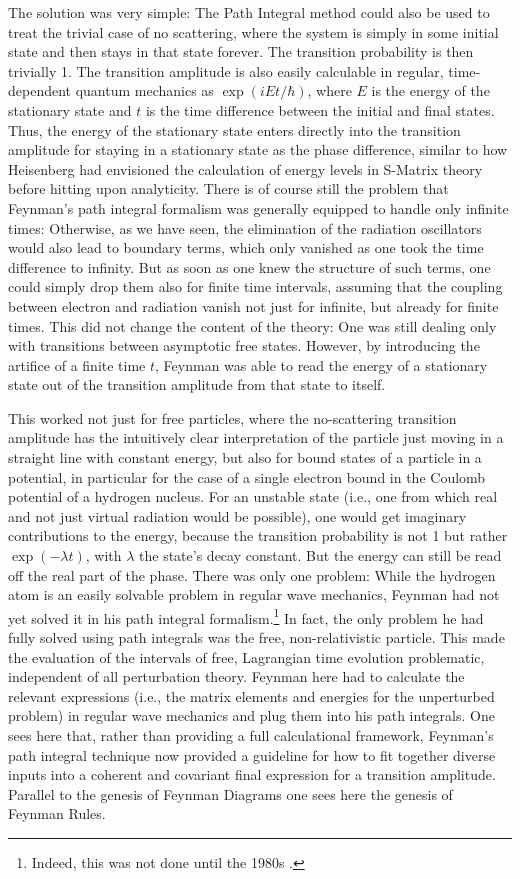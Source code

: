 \documentclass[12pt]{article}
\begin{document}
The solution was very simple: The Path Integral method could also be used to treat the trivial case of no scattering, where the system is simply in some initial state and then stays in that state forever. The transition probability is then trivially 1. The transition amplitude is also easily calculable in regular, time-dependent quantum mechanics as $\exp{(i E t/\hbar)}$, where $E$ is the energy of the stationary state and $t$ is the time difference between the initial and final states. Thus, the energy of the stationary state enters directly into the transition amplitude for staying in a stationary state as the phase difference, similar to how Heisenberg had envisioned the calculation of energy levels in S-Matrix theory before hitting upon analyticity. There is of course still the problem that Feynman's path integral formalism was generally equipped to handle only infinite times: Otherwise, as we have seen, the elimination of the radiation oscillators would also lead to boundary terms, which only vanished as one took the time difference to infinity. But as soon as one knew the structure of such terms, one could simply drop them also for finite time intervals, assuming that the coupling between electron and radiation vanish not just for infinite, but already for finite times. This did not change the content of the theory: One was still dealing only with transitions between asymptotic free states. However, by introducing the artifice of a finite time $t$, Feynman was able to read the energy of a stationary state out of the transition amplitude from that state to itself.

This worked not just for free particles, where the no-scattering transition amplitude has the intuitively clear interpretation of the particle just moving in a straight line with constant energy, but also for bound states of a particle in a potential, in particular for the case of a single electron bound in the Coulomb potential of a hydrogen nucleus. For an unstable state (i.e., one from which real and not just virtual radiation would be possible), one would get imaginary contributions to the energy, because the transition probability is not 1 but rather $\exp{(- \lambda t)}$, with $\lambda$ the state's decay constant. But the energy can still be read off the real part of the phase. There was only one problem: While the hydrogen atom is an easily solvable problem in regular wave mechanics, Feynman had not yet solved it in his path integral formalism.\footnote{Indeed, this was not done until the 1980s \citep{duru_1982_quantum}.} In fact, the only problem he had fully solved using path integrals was the free, non-relativistic particle. This made the evaluation of the intervals of free, Lagrangian time evolution problematic, independent of all perturbation theory. Feynman here had to calculate the relevant expressions (i.e., the matrix elements and energies for the unperturbed problem) in regular wave mechanics and plug them into his path integrals. One sees here that, rather than providing a full calculational framework, Feynman's path integral technique now provided a guideline for how to fit together diverse inputs into a coherent and covariant final expression for a transition amplitude. Parallel to the genesis of Feynman Diagrams one sees here the genesis of Feynman Rules.
\end{document}
